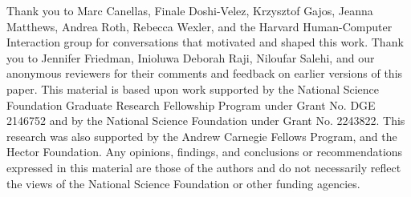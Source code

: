 \documentclass[sigconf]{acmart}
\begin{document}
\begin{acks}
Thank you to Marc Canellas, Finale Doshi-Velez, Krzysztof Gajos, Jeanna Matthews, Andrea Roth, Rebecca Wexler, and the Harvard Human-Computer Interaction group for conversations that motivated and shaped this work. Thank you to Jennifer Friedman, Inioluwa Deborah Raji, Niloufar Salehi, and our anonymous reviewers for their comments and feedback on earlier versions of this paper. This material is based upon work supported by the National Science Foundation Graduate Research Fellowship Program under Grant No. DGE 2146752 and by the National Science Foundation under Grant No. 2243822. This research was also supported by the Andrew Carnegie Fellows Program, and the Hector Foundation. Any opinions, findings, and conclusions or recommendations expressed in this material are those of the authors and do not necessarily reflect the views of the National Science Foundation or other funding agencies. 
\end{acks}





\appendix

\end{document}
